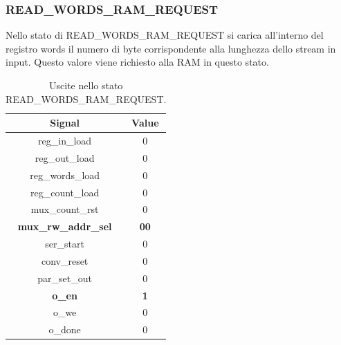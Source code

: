 \documentclass[a4paper]{report}
\begin{document}
\subsubsection{READ\_WORDS\_RAM\_REQUEST}
Nello stato di READ\_WORDS\_RAM\_REQUEST si carica all'interno del registro words il numero di byte corrispondente alla lunghezza dello stream in input. Questo valore viene richiesto alla RAM in questo stato.
\begin{table}[H]
  \centering
  \begin{tabular}{||c | c||} 
    \hline
    Signal & Value \\
    \hline\hline
    reg\_in\_load & 0 \\
    reg\_out\_load & 0 \\
    reg\_words\_load & 0 \\
    reg\_count\_load & 0 \\
    mux\_count\_rst & 0 \\
    \textbf{mux\_rw\_addr\_sel} & \textbf{00} \\
    ser\_start & 0 \\
    conv\_reset & 0 \\
    par\_set\_out & 0 \\
    \textbf{o\_en} & \textbf{1} \\
    o\_we & 0 \\
    o\_done & 0 \\
   \hline
  \end{tabular}
  \caption{Uscite nello stato READ\_WORDS\_RAM\_REQUEST.}
  \label{table:2}
\end{table}
\end{document}
